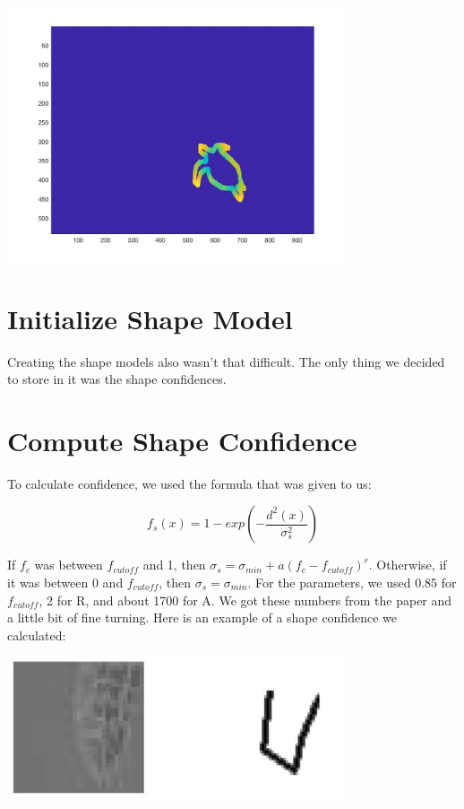 \documentclass{article}
\begin{document}
	\begin{center}
		\includegraphics[width=100mm]{img/i4}
	\end{center}

	\section{Initialize Shape Model}
	Creating the shape models also wasn’t that difficult. The only thing we decided to store in it was the shape confidences. 
	
	\section{Compute Shape Confidence}
	
	To calculate confidence, we used the formula that was given to us:
	
	$$f_s(x)=1-exp(-\frac{d^2(x)}{\sigma^2_s})$$
	
	If $f_c$ was between $f_{cutoff}$ and 1, then $\sigma_s=\sigma_{min}+a(f_c-f_{cutoff})^r$. Otherwise, if it was between 0 and $f_{cutoff}$, then $\sigma_s=\sigma_{min}$. For the parameters, we used 0.85 for $f_{cutoff}$, 2 for R, and about 1700 for A. We got these numbers from the paper and a little bit of fine turning. Here is an example of a shape confidence we calculated:
	
	\begin{center}
		\includegraphics[width=100mm]{img/i12}
	\end{center}
	
\end{document}
